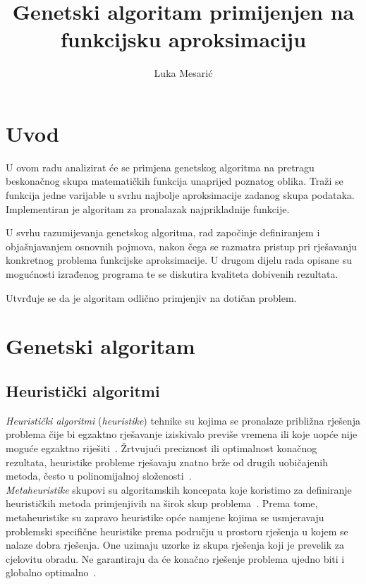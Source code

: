 \documentclass[times, utf8, seminar, numeric]{fer}
\begin{document}
\nocite{*}

\title{Genetski algoritam primijenjen na funkcijsku aproksimaciju}

\author{Luka Mesarić}


\maketitle

\tableofcontents

\chapter{Uvod}

U ovom radu analizirat će se primjena genetskog algoritma na pretragu beskonačnog skupa matematičkih funkcija unaprijed poznatog oblika.
Traži se funkcija jedne varijable u svrhu najbolje aproksimacije zadanog skupa podataka.
Implementiran je algoritam za pronalazak najprikladnije funkcije.

U svrhu razumijevanja genetskog algoritma, rad započinje definiranjem i objašnjavanjem osnovnih pojmova, nakon čega se razmatra pristup pri rješavanju konkretnog problema funkcijske aproksimacije.
U drugom dijelu rada opisane su mogućnosti izrađenog programa te se diskutira kvaliteta dobivenih rezultata.

Utvrđuje se da je algoritam odlično primjenjiv na dotičan problem.


\chapter{Genetski algoritam}

\section{Heuristički algoritmi}

\textit{Heuristički algoritmi} (\textit{heuristike}) tehnike su kojima se pronalaze približna rješenja problema čije bi egzaktno rješavanje iziskivalo previše vremena ili koje uopće nije moguće egzaktno riješiti~\cite{Cupic}.
Žrtvujući preciznost ili optimalnost konačnog rezultata, heuristike probleme rješavaju znatno brže od drugih uobičajenih metoda, često u polinomijalnoj složenosti~\cite{WikiHeuristic}.\\

\textit{Metaheuristike} skupovi su algoritamskih koncepata koje koristimo za definiranje heurističkih metoda primjenjivih na širok skup problema~\cite{Cupic}.
Prema tome, metaheuristike su zapravo heuristike opće namjene kojima se usmjeravaju problemski specifične heuristike prema području u prostoru rješenja u kojem se nalaze dobra rješenja.
One uzimaju uzorke iz skupa rješenja koji je prevelik za cjelovitu obradu.
Ne garantiraju da će konačno rješenje problema ujedno biti i globalno optimalno~\cite{WikiMetaheuristic}.
\end{document}
